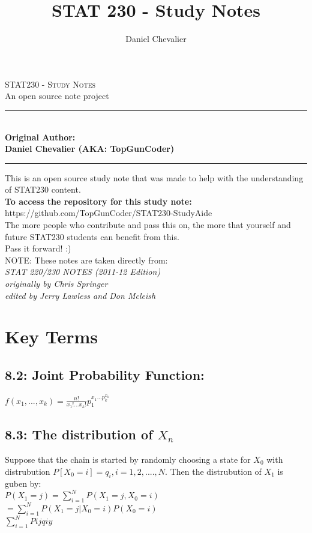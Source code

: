 \documentclass[11pt]{article}
\author{Daniel Chevalier}
\title{STAT 230 - Study Notes}
\newcommand{\HRule}{\rule{\linewidth}{0.5mm}}
\begin{document}
	\begin{titlepage}
		\begin{center}
			\textsc{\LARGE STAT230 - Study Notes}\\
			{\Large An open source note project}\\

			
			\HRule\\
				{\large \bf Original Author:\\ Daniel Chevalier (AKA: TopGunCoder)}
			\HRule
			
			This is an open source study note that was made to help with the understanding of STAT230 content.\\
			
			{\large \bf To access the repository for this study note:}\\
			https://github.com/TopGunCoder/STAT230-StudyAide\\
			The more people who contribute and pass this on, the more that yourself and future STAT230 students can benefit from this.\\
			Pass it forward! :)\\
			\vfill
			NOTE: These notes are taken directly from: \\
			\emph{STAT 220/230 NOTES (2011-12 Edition)\\
			originally by Chris Springer\\
			edited by Jerry Lawless and Don Mcleish}
		\end{center}
	\end{titlepage}

\newpage
\section*{Key Terms}
	\subsection*{8.2: Joint Probability Function:}
		$f(x_1,...,x_k)=\frac{n!}{x_1!...x_k!}p_1^{x_1...p_k^{x_k}}$
	
	\subsection*{8.3: The distribution of $X_n$}
		Suppose that the chain is started by randomly choosing a state for $X_0$ with distrubution $P[X_0=i]=q_i,i=1,2,....,N$. Then the distrubution of $X_1$ is guben by:\\
		$P(X_1=j)=\sum_{i=1}^{N}P(X_1=j,X_0=i)$\\
		$=\sum^N_{i=1}P(X_1=j|X_0=i)P(X_0=i)$\\
		$\sum_{i=1}^N Pijqiy$
\end{document}
